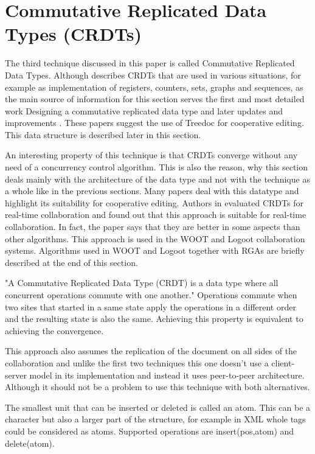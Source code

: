 \documentclass[12pt,oneside]{fithesis2}
\begin{document}
\section{Commutative Replicated Data Types (CRDTs)}
\par The third technique discussed in this paper is called Commutative Replicated Data Types. Although \cite{Shapiro-long} describes CRDTs that are used in various situations, for example as implementation of registers, counters, sets, graphs and sequences, as the main source of information for this section serves the first and most detailed work Designing a commutative replicated data type \cite{Shapiro-design} and later updates and improvements \cite{Shapiro-editing} \cite{Shapiro-consistency}. These papers suggest the use of Treedoc for cooperative editing. This data structure is described later in this section. 
\par An interesting property of this technique is that CRDTs converge without any need of a concurrency control algorithm. This is also the reason, why this section deals mainly with the architecture of the data type and not with the technique as a whole like in the previous sections. Many papers deal with this datatype and highlight its suitability for cooperative editing. Authors in \cite{CRDT-real} evaluated CRDTs for real-time collaboration and found out that this approach is suitable for real-time collaboration. In fact, the paper says that they are better in some aspects than other algorithms. This approach is used in the WOOT \cite{WOOT} and Logoot \cite{Logoot} collaboration systems. Algorithms used in WOOT and Logoot together with RGAs \cite{RGA} are briefly described at the end of this section.
\par "A Commutative Replicated Data Type (CRDT) is a data type where all concurrent operations commute with one another." \cite{Shapiro-design} Operations commute when two sites that started in a same state apply the operations in a different order and the resulting state is also the same. Achieving this property is equivalent to achieving the convergence.
\par This approach also assumes the replication of the document on all sides of the collaboration and unlike the first two techniques this one doesn't use a client-server model in its implementation and instead it uses peer-to-peer architecture. Although it should not be a problem to use this technique with both alternatives. 
\par The smallest unit that can be inserted or deleted is called an atom. This can be a character but also a larger part of the structure, for example in XML whole tags could be considered as atoms. Supported operations are insert(pos,atom) and delete(atom). 
\end{document}
